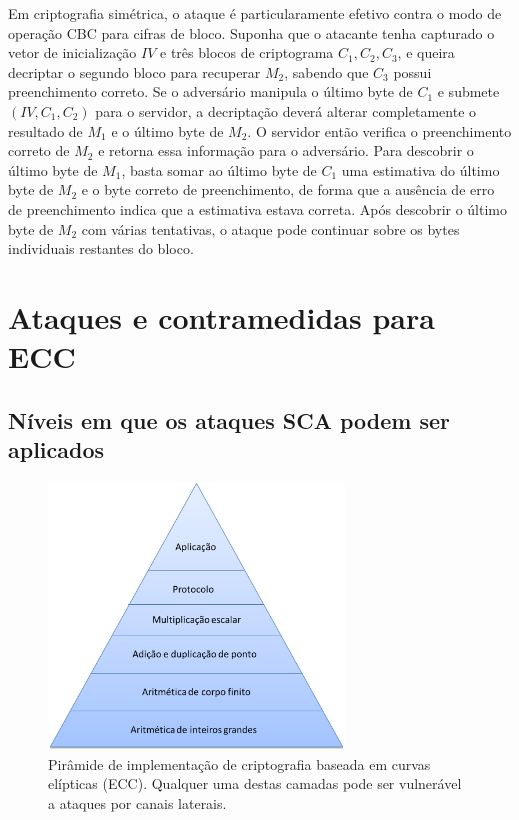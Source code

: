 \documentclass{SBCbookchapter}
\begin{document}
Em criptografia simétrica, o ataque é particularamente efetivo contra o modo de operação CBC para cifras de bloco. Suponha que o atacante tenha capturado o vetor de inicialização $IV$ e três blocos de criptograma $C_1,C_2,C_3$, e queira decriptar o segundo bloco para recuperar $M_2$, sabendo que $C_3$ possui preenchimento correto. Se o adversário manipula o último byte de $C_1$ e submete $(IV, C_1, C_2)$ para o servidor, a decriptação deverá alterar completamente o resultado de $M_1$ e o último byte de $M_2$. O servidor então verifica o preenchimento correto de $M_2$ e retorna essa informação para o adversário. Para descobrir o último byte de $M_1$, basta somar ao último byte de $C_1$ uma estimativa do último byte de $M_2$ e o byte correto de preenchimento, de forma que a ausência de erro de preenchimento indica que a estimativa estava correta. Após descobrir o último byte de $M_2$ com várias tentativas, o ataque pode continuar sobre os bytes individuais restantes do bloco.


\section{Ataques e contramedidas para ECC}

%
\subsection{Níveis em que os ataques SCA podem ser aplicados}


\begin{figure}[h!tb]
	\centering   %
	\includegraphics[width=0.7\textwidth]{figures/piramide_ECC.png}
	\caption{
		Pirâmide de implementação de criptografia baseada em curvas elípticas (ECC). Qualquer uma destas camadas pode ser vulnerável a ataques por canais laterais.
	}
	\label{fig:pyramid-ecc}
\end{figure}
\end{document}
